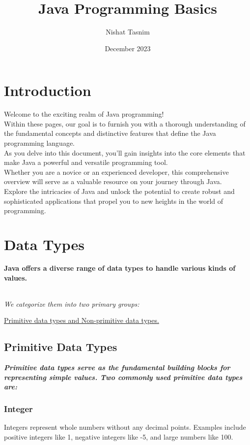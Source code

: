 \documentclass{article}
\title{Java Programming Basics}
\author{Nishat Tasnim}
\date{December 2023}
\begin{document}
\maketitle

\section{Introduction}
\tiny
Welcome to the exciting realm of Java programming!\\
\small
Within these pages, our goal is to furnish you with a thorough understanding of the fundamental concepts and distinctive features that define the Java programming language.\\
\footnotesize
As you delve into this document, you'll gain insights into the core elements that make Java a powerful and versatile programming tool.\\
\large
Whether you are a novice or an experienced developer, this comprehensive overview will serve as a valuable resource on your journey through Java.\\
\huge
Explore the intricacies of Java and unlock the potential to create robust and sophisticated applications that propel you to new heights in the world of programming.

\section{Data Types}
\large
\textbf{Java offers a diverse range of data types to handle various kinds of values.}

\small
\textit{\\We categorize them into two primary groups:}

\large
\underline{Primitive data types and Non-primitive data types.}

\subsection{Primitive Data Types}
\large
\textbf{\textit{Primitive data types serve as the fundamental building blocks for representing simple values. Two commonly used primitive data types are:}}

\subsubsection{Integer}
Integers represent whole numbers without any decimal points. Examples include positive integers like 1, negative integers like -5, and large numbers like 100.
\end{document}
